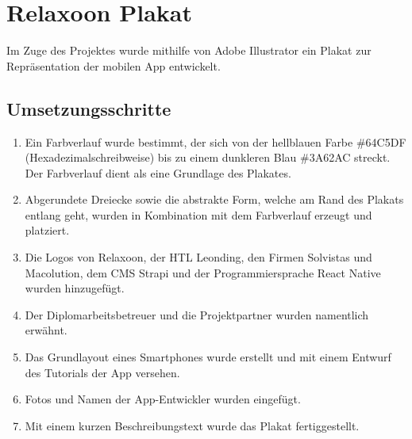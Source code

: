 \begin{spacing}{1}
\begin{quotation}
    \end{quotation}


    \section{Relaxoon Plakat}\label{sec:plakat}

    Im Zuge des Projektes wurde mithilfe von Adobe Illustrator ein Plakat zur Repräsentation der mobilen App
    entwickelt. 

    \subsection{Umsetzungsschritte}

    \begin{enumerate}
        \item Ein Farbverlauf wurde bestimmt, der sich von der hellblauen Farbe \#64C5DF (Hexadezimalschreibweise)
        bis zu einem dunkleren Blau \#3A62AC streckt. Der Farbverlauf dient als eine Grundlage des Plakates.
        \item Abgerundete Dreiecke sowie die abstrakte Form, welche am Rand des Plakats entlang geht,
         wurden in Kombination mit dem Farbverlauf erzeugt und platziert.
        \item Die Logos von Relaxoon, der HTL Leonding, den Firmen Solvistas und Macolution, dem CMS Strapi und der Programmiersprache React Native wurden hinzugefügt.
        \item Der Diplomarbeitsbetreuer und die Projektpartner wurden namentlich erwähnt.
        \item Das Grundlayout eines Smartphones wurde erstellt und mit einem Entwurf des Tutorials der App versehen.
        \item Fotos und Namen der App-Entwickler wurden eingefügt.
        \item Mit einem kurzen Beschreibungstext wurde das Plakat fertiggestellt.
      \end{enumerate}



\end{spacing}

